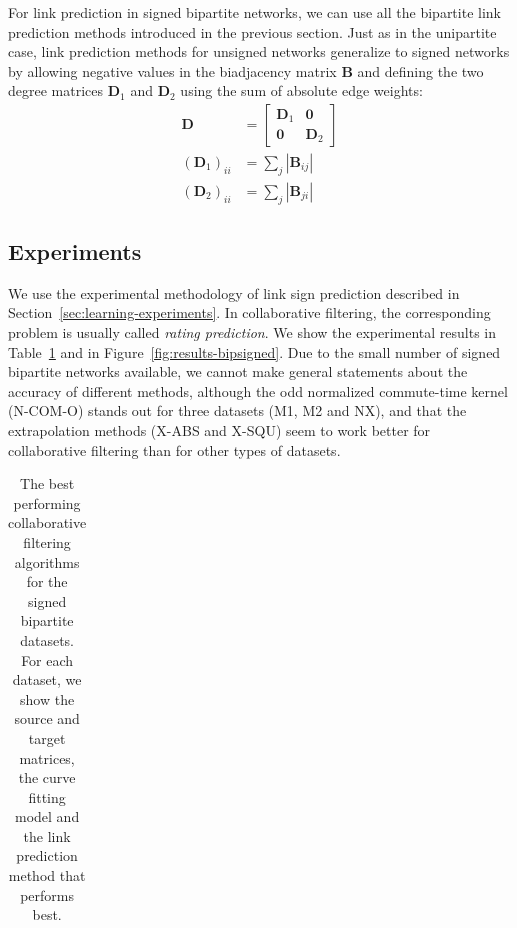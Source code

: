 \documentclass[11pt,a4paper]{book}
\begin{document}
For link prediction in signed bipartite networks, we can use all the
bipartite link prediction methods introduced in the previous section.
Just as in the unipartite case, link prediction methods for unsigned
networks generalize to signed networks by allowing negative values in
the biadjacency matrix $\mathbf B$ and defining the two degree matrices
$\mathbf D_1$ and $\mathbf D_2$ using the sum of absolute edge weights: 
\begin{align}
  \mathbf D &= \left[ \begin{array}{cc} \mathbf D_1 & \mathbf 0
      \\ \mathbf 0 & \mathbf D_2 \end{array} \right] \\
  (\mathbf D_1)_{ii} &= \sum_j |\mathbf B_{ij}| \\
  (\mathbf D_2)_{ii} &= \sum_j |\mathbf B_{ji}| 
\end{align}

\subsection{Experiments}
We use the experimental methodology of link sign prediction described
in Section~\ref{sec:learning-experiments}.  In collaborative filtering,
the corresponding 
problem is usually called \emph{rating prediction}. 
We show the experimental results in Table~\ref{tab:bestcurve-bipsigned} and
in Figure~\ref{fig:results-bipsigned}. 
Due to the small number of signed bipartite networks available, we
cannot make general statements about the accuracy of different methods,
although the odd normalized commute-time kernel
(\textrm{N-COM-O}) stands out for three datasets (\textsf{M1},
\textsf{M2} and \textsf{NX}), and that the extrapolation methods
(\textrm{X-ABS} and \textrm{X-SQU}) seem to work better for collaborative
filtering than for other types of datasets. 

\begin{table}[h!]
  \centering
  \caption{
    The best performing collaborative filtering algorithms for the signed
    bipartite datasets.  
    For each dataset, we show the source and target matrices, the curve
    fitting model and the link prediction method that performs best. 
  }
  \begin{tabular}{ lllll }
    \toprule
    
    \midrule
    
    \bottomrule
  \end{tabular}			
  \label{tab:bestcurve-bipsigned}
\end{table}
\end{document}
